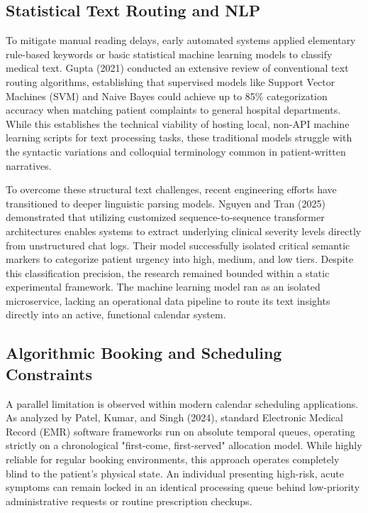 \documentclass[12pt,a4paper]{report}
\begin{document}
\subsection{Statistical Text Routing and NLP}
To mitigate manual reading delays, early automated systems applied elementary rule-based keywords or basic statistical machine learning models to classify medical text. Gupta (2021) conducted an extensive review of conventional text routing algorithms, establishing that supervised models like Support Vector Machines (SVM) and Naive Bayes could achieve up to 85\% categorization accuracy when matching patient complaints to general hospital departments. While this establishes the technical viability of hosting local, non-API machine learning scripts for text processing tasks, these traditional models struggle with the syntactic variations and colloquial terminology common in patient-written narratives.

To overcome these structural text challenges, recent engineering efforts have transitioned to deeper linguistic parsing models. Nguyen and Tran (2025) demonstrated that utilizing customized sequence-to-sequence transformer architectures enables systems to extract underlying clinical severity levels directly from unstructured chat logs. Their model successfully isolated critical semantic markers to categorize patient urgency into high, medium, and low tiers. Despite this classification precision, the research remained bounded within a static experimental framework. The machine learning model ran as an isolated microservice, lacking an operational data pipeline to route its text insights directly into an active, functional calendar system.

\subsection{Algorithmic Booking and Scheduling Constraints}
A parallel limitation is observed within modern calendar scheduling applications. As analyzed by Patel, Kumar, and Singh (2024), standard Electronic Medical Record (EMR) software frameworks run on absolute temporal queues, operating strictly on a chronological "first-come, first-served" allocation model. While highly reliable for regular booking environments, this approach operates completely blind to the patient's physical state. An individual presenting high-risk, acute symptoms can remain locked in an identical processing queue behind low-priority administrative requests or routine prescription checkups.
\end{document}
